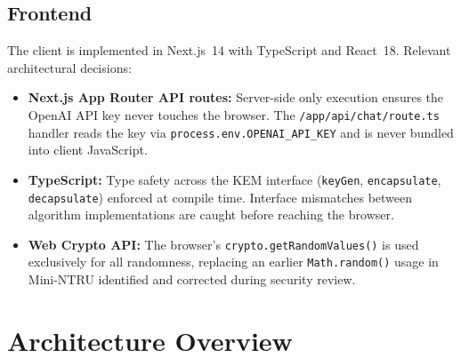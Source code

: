 \documentclass[12pt,a4paper]{report}
\begin{document}
\subsection{Frontend}

The client is implemented in Next.js~14 with TypeScript and React~18. Relevant
architectural decisions:

\begin{itemize}
  \item \textbf{Next.js App Router API routes:} Server-side only execution ensures the
  OpenAI API key never touches the browser. The \texttt{/app/api/chat/route.ts} handler
  reads the key via \texttt{process.env.OPENAI\_API\_KEY} and is never bundled into
  client JavaScript.

  \item \textbf{TypeScript:} Type safety across the KEM interface (\texttt{keyGen},
  \texttt{encapsulate}, \texttt{decapsulate}) enforced at compile time. Interface
  mismatches between algorithm implementations are caught before reaching the browser.

  \item \textbf{Web Crypto API:} The browser's \texttt{crypto.getRandomValues()} is
  used exclusively for all randomness, replacing an earlier \texttt{Math.random()} usage
  in Mini-NTRU identified and corrected during security review.
\end{itemize}

\section{Architecture Overview}
\end{document}
